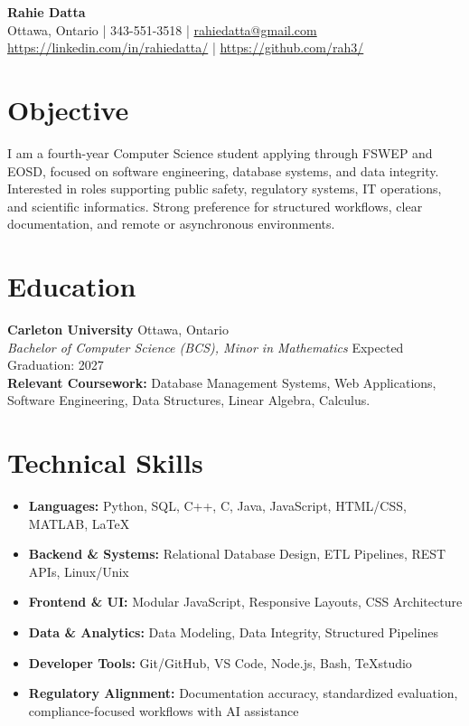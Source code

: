 \documentclass[12pt,letterpaper]{article}
\begin{document}
	
	\begin{center}
		{\Huge \textbf{Rahie Datta}} \\ \vspace{5pt}
		Ottawa, Ontario | 343-551-3518 | \url{rahiedatta@gmail.com} \\
		\url{https://linkedin.com/in/rahiedatta/} | \url{https://github.com/rah3/}
	\end{center}
	
	\vspace{-10pt}
	
	\section{Objective}
	I am a fourth-year Computer Science student applying through FSWEP and EOSD, focused on software engineering, database systems, and data integrity. Interested in roles supporting public safety, regulatory systems, IT operations, and scientific informatics. Strong preference for structured workflows, clear documentation, and remote or asynchronous environments.
	
	\section{Education}
	\noindent
	\textbf{Carleton University} \hfill Ottawa, Ontario \\
	\textsl{Bachelor of Computer Science (BCS), Minor in Mathematics} \hfill Expected Graduation: 2027 \\
	\textbf{Relevant Coursework:} Database Management Systems, Web Applications, Software Engineering, Data Structures, Linear Algebra, Calculus.
	
	\section{Technical Skills}
	\begin{itemize}
		\item \textbf{Languages:} Python, SQL, C++, C, Java, JavaScript, HTML/CSS, MATLAB, LaTeX
		\item \textbf{Backend \& Systems:} Relational Database Design, ETL Pipelines, REST APIs, Linux/Unix
		\item \textbf{Frontend \& UI:} Modular JavaScript, Responsive Layouts, CSS Architecture
		\item \textbf{Data \& Analytics:} Data Modeling, Data Integrity, Structured Pipelines
		\item \textbf{Developer Tools:} Git/GitHub, VS Code, Node.js, Bash, TeXstudio
		\item \textbf{Regulatory Alignment:} Documentation accuracy, standardized evaluation, compliance-focused workflows with AI assistance
	\end{itemize}
	
\end{document}
